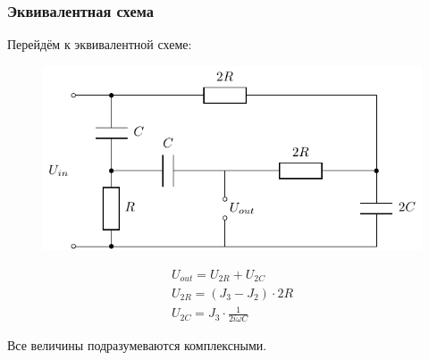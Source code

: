 \subsubsection{Эквивалентная схема}
    
Перейдём к эквивалентной схеме:
\begin{figure}[H]
	\centering
	\includegraphics[]{chems/pic6a}
	\label{fig:ph_fa}
\end{figure}

\begin{gather}
	U_{out}=U_{2R}+U_{2C}\\
	U_{2R}=(J_3-J_2)\cdot 2R\\
	U_{2C}=J_3\cdot\frac{1}{2i\omega C}
\end{gather}

Все величины подразумеваются комплексными.

